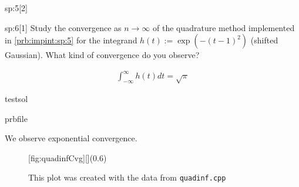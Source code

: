 \begin{samproblem}
\begin{subproblem}{sp:5}[2]
\end{subproblem}

\begin{subproblem}{sp:6}[1]
  Study the convergence as $n \rightarrow \infty$ of the quadrature method implemented in \ref{prb:impint:sp:5} for the integrand 
  $h(t) := \exp(-(t-1)^2)$ (shifted Gaussian). What kind of convergence do you observe?

  \begin{samhint}
    \begin{align}
      \int_{-\infty}^{\infty} h(t) dt = \sqrt{\pi}
    \end{align}
  \end{samhint}

  \begin{samwriteprbpart}{testsol}
    \begin{writeverbatim}{prbfile}
      \begin{samsolution}
        We observe exponential convergence. 
        \begin{figure}
          \centering
          [fig:quadinfCvg][](0.6\textwidth)
          \caption{This plot was created with the data from \texttt{quadinf.cpp}}
        \end{figure}
      \end{samsolution}
    \end{writeverbatim}
  \end{samwriteprbpart}

\end{subproblem}

\end{samproblem}
